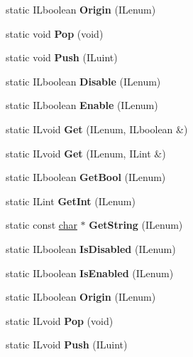 \begin{DoxyCompactItemize}
\mbox{\label{classilState_a77eed5cd8ac17b39a8c6be7951206c85}} 
static I\+Lboolean {\bfseries Origin} (I\+Lenum)
\item 
\mbox{\label{classilState_ad0c10cb2b743b31c68b55e3f01cc13a3}} 
static void {\bfseries Pop} (void)
\item 
\mbox{\label{classilState_a15102a1acadeb4f2fce5a9036df1bf47}} 
static void {\bfseries Push} (I\+Luint)
\item 
\mbox{\label{classilState_a268fd74c2e136371f87ff9b274e2d624}} 
static I\+Lboolean {\bfseries Disable} (I\+Lenum)
\item 
\mbox{\label{classilState_a36430dec38f2372a2691b39173552d46}} 
static I\+Lboolean {\bfseries Enable} (I\+Lenum)
\item 
\mbox{\label{classilState_ab79dce3bb0b4f3493f6aa3da32729dc7}} 
static I\+Lvoid {\bfseries Get} (I\+Lenum, I\+Lboolean \&)
\item 
\mbox{\label{classilState_acd122a01adf3d2bafd1c83ea2e02824c}} 
static I\+Lvoid {\bfseries Get} (I\+Lenum, I\+Lint \&)
\item 
\mbox{\label{classilState_aca8a4b62a2d7c6fdab01651c4406185e}} 
static I\+Lboolean {\bfseries Get\+Bool} (I\+Lenum)
\item 
\mbox{\label{classilState_a1ef08250ebc59d85be7ac76bff1984ae}} 
static I\+Lint {\bfseries Get\+Int} (I\+Lenum)
\item 
\mbox{\label{classilState_ab329213345ecd03ae6b5596a321ad12e}} 
static const \hyperlink{classchar}{char} $\ast$ {\bfseries Get\+String} (I\+Lenum)
\item 
\mbox{\label{classilState_ab781af41cf8e62172e227f54863dddd4}} 
static I\+Lboolean {\bfseries Is\+Disabled} (I\+Lenum)
\item 
\mbox{\label{classilState_a3a825abb8673d607bc7236582706fb61}} 
static I\+Lboolean {\bfseries Is\+Enabled} (I\+Lenum)
\item 
\mbox{\label{classilState_aee802bef060eb301f5ee41e76e0d365b}} 
static I\+Lboolean {\bfseries Origin} (I\+Lenum)
\item 
\mbox{\label{classilState_a81e65157cbaa8ced4a26dde3e877cdf2}} 
static I\+Lvoid {\bfseries Pop} (void)
\item 
\mbox{\label{classilState_ac0196b03ec0b8424a48299ec1f730308}} 
static I\+Lvoid {\bfseries Push} (I\+Luint)
\end{DoxyCompactItemize}


